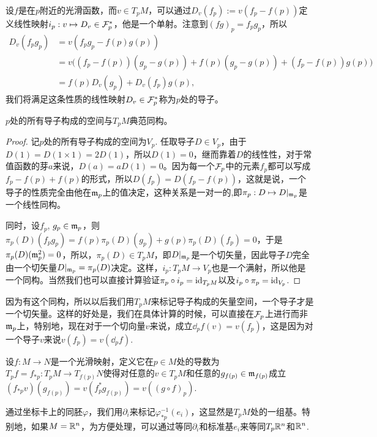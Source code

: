 设$f$是在$p$附近的光滑函数，而$v\in T_pM$，可以通过$D_v(f_p):=v(f_p-f(p))$定义线性映射$i_p:v\mapsto D_v\in \mathcal{F}_p^*$，他是一个单射。注意到$(fg)_p=f_pg_p$，所以
\begin{align*}
	D_v(f_pg_p)&=v(f_pg_p-f(p)g(p))\\
	&=v\bigl((f_p-f(p))(g_p-g(p))+f(p)(g_p-g(p))+(f_p-f(p))g(p)\bigr)\\
	&=f(p)D_v(g_p)+D_v(f_p)g(p),
\end{align*}
我们将满足这条性质的线性映射$D_v\in \mathcal{F}_p^*$称为$p$处的导子。

\begin{lem}
$p$处的所有导子构成的空间与$T_pM$典范同构。
\end{lem}

\begin{proof}
记$p$处的所有导子构成的空间为$V_p$. 任取导子$D\in V_p$，由于$D(1)=D(1\times 1)=2D(1)$，所以$D(1)=0$，继而靠着$D$的线性性，对于常值函数的芽$a$来说，$D(a)=aD(1)=0$。因为每一个$\mathcal{F}_p$中的元素$f_p$都可以写成$f_p-f(p)+f(p)$的形式，所以$D(f_p)=D(f_p-f(p))$，这就是说，一个导子的性质完全由他在$\mathfrak{m}_p$上的值决定，这种关系是一对一的,即$\pi_p:D\mapsto D|_{\mathfrak{m}_p}$是一个线性同构。

同时，设$f_p$, $g_p\in \mathfrak{m}_p$，则$\pi_p(D)(f_pg_p)=f(p)\pi_p(D)(g_p)+g(p)\pi_p(D)(f_p)=0$，于是$\pi_p(D)(\mathfrak{m}_p^2)=0$，所以，$\pi_p(D)\in T_pM$，即$D|_{\mathfrak{m}_p}$是一个切矢量，因此导子$D$完全由一个切矢量$D|_{\mathfrak{m}_p}=\pi_p(D)$决定。这样，$i_p:T_pM\to V_p$也是一个满射，所以他是一个同构。当然我们也可以直接计算验证$\pi_p\circ i_p=\operatorname{id}_{T_pM}$以及$i_p\circ \pi_p=\operatorname{id}_{V_p}$.
\end{proof}

因为有这个同构，所以以后我们用$T_pM$来标记导子构成的矢量空间，一个导子才是一个切矢量。这样的好处是，我们在具体计算的时候，可以直接在$\mathcal{F}_p$上进行而非$\mathfrak{m}_p$上，特别地，现在对于一个切向量$v$来说，成立$\dd_pf(v)=v(f_p)$，这是因为对一个导子$v$来说$v(f_p)=v(\dd_pf)$.

\begin{para}[推前映射]
设$f:M\to N$是一个光滑映射，定义它在$p\in M$处的导数为$T_pf=f_{*p}:T_pM\to T_{f(p)}N$使得对任意的$v\in T_p M$和任意的$g_{f(p)}\in \mathfrak{m}_{f(p)}$成立$(f_{*p}v)(g_{f(p)})=v(f_p^*g_{f(p)})=v((g\circ f)_p)$.
\end{para}

通过坐标卡上的同胚$\varphi$，我们用$\partial_i$来标记$\varphi^{-1}_{*p}(e_i)$，这显然是$T_pM$处的一组基。特别地，如果$M=\mathbb{R}^n$，为方便处理，可以通过等同$\partial_i$和标准基$e_i$来等同$T_p\mathbb{R}^n$和$\mathbb{R}^n$. 

